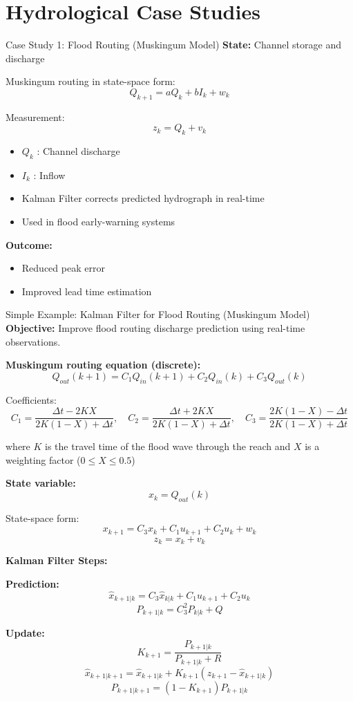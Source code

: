 \documentclass[8pt]{beamer}
\begin{document}
\section{Hydrological Case Studies}

\begin{frame}{Case Study 1: Flood Routing (Muskingum Model)}
\textbf{State:} Channel storage and discharge

Muskingum routing in state-space form:
\begin{equation}
Q_{k+1} = a Q_k + b I_k + w_k
\end{equation}

Measurement:
\begin{equation}
z_k = Q_k + v_k
\end{equation}

\begin{itemize}
\item $Q_k$ : Channel discharge
\item $I_k$ : Inflow
\item Kalman Filter corrects predicted hydrograph in real-time
\item Used in flood early-warning systems
\end{itemize}

\textbf{Outcome:}
\begin{itemize}
\item Reduced peak error
\item Improved lead time estimation
\end{itemize}
\end{frame}

\begin{frame}{Simple Example: Kalman Filter for Flood Routing (Muskingum Model)}
\textbf{Objective:} Improve flood routing discharge prediction using real-time observations.

\medskip
\textbf{Muskingum routing equation (discrete):}
\[
Q_{out}(k+1) = C_1 Q_{in}(k+1) + C_2 Q_{in}(k) + C_3 Q_{out}(k)
\]

Coefficients:
\[
C_1 = \frac{\Delta t - 2KX}{2K(1-X)+\Delta t}, \quad
C_2 = \frac{\Delta t + 2KX}{2K(1-X)+\Delta t}, \quad
C_3 = \frac{2K(1-X)-\Delta t}{2K(1-X)+\Delta t}
\]

where $K$ is the travel time of the flood wave through the reach and $X$ is a weighting factor ($0 \leq X \leq 0.5$)

\textbf{State variable:}
\[
x_k = Q_{out}(k)
\]

State-space form:
\[
x_{k+1} = C_3 x_k + C_1 u_{k+1} + C_2 u_k + w_k
\]
\[
z_k = x_k + v_k
\]

\textbf{Kalman Filter Steps:}

\textbf{Prediction:}
\[
\hat{x}_{k+1|k} = C_3 \hat{x}_{k|k} + C_1 u_{k+1} + C_2 u_k
\]
\[
P_{k+1|k} = C_3^2 P_{k|k} + Q
\]

\textbf{Update:}
\[
K_{k+1} = \frac{P_{k+1|k}}{P_{k+1|k}+R}
\]
\[
\hat{x}_{k+1|k+1} = \hat{x}_{k+1|k} + K_{k+1}(z_{k+1}-\hat{x}_{k+1|k})
\]
\[
P_{k+1|k+1} = (1-K_{k+1})P_{k+1|k}
\]
\end{frame}
\end{document}
